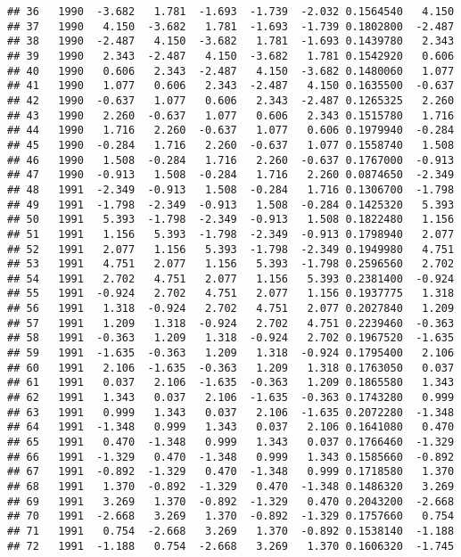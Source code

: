 \documentclass[]{article}
\begin{document}
\begin{verbatim}
## 36   1990  -3.682   1.781  -1.693  -1.739  -2.032 0.1564540   4.150
## 37   1990   4.150  -3.682   1.781  -1.693  -1.739 0.1802800  -2.487
## 38   1990  -2.487   4.150  -3.682   1.781  -1.693 0.1439780   2.343
## 39   1990   2.343  -2.487   4.150  -3.682   1.781 0.1542920   0.606
## 40   1990   0.606   2.343  -2.487   4.150  -3.682 0.1480060   1.077
## 41   1990   1.077   0.606   2.343  -2.487   4.150 0.1635500  -0.637
## 42   1990  -0.637   1.077   0.606   2.343  -2.487 0.1265325   2.260
## 43   1990   2.260  -0.637   1.077   0.606   2.343 0.1515780   1.716
## 44   1990   1.716   2.260  -0.637   1.077   0.606 0.1979940  -0.284
## 45   1990  -0.284   1.716   2.260  -0.637   1.077 0.1558740   1.508
## 46   1990   1.508  -0.284   1.716   2.260  -0.637 0.1767000  -0.913
## 47   1990  -0.913   1.508  -0.284   1.716   2.260 0.0874650  -2.349
## 48   1991  -2.349  -0.913   1.508  -0.284   1.716 0.1306700  -1.798
## 49   1991  -1.798  -2.349  -0.913   1.508  -0.284 0.1425320   5.393
## 50   1991   5.393  -1.798  -2.349  -0.913   1.508 0.1822480   1.156
## 51   1991   1.156   5.393  -1.798  -2.349  -0.913 0.1798940   2.077
## 52   1991   2.077   1.156   5.393  -1.798  -2.349 0.1949980   4.751
## 53   1991   4.751   2.077   1.156   5.393  -1.798 0.2596560   2.702
## 54   1991   2.702   4.751   2.077   1.156   5.393 0.2381400  -0.924
## 55   1991  -0.924   2.702   4.751   2.077   1.156 0.1937775   1.318
## 56   1991   1.318  -0.924   2.702   4.751   2.077 0.2027840   1.209
## 57   1991   1.209   1.318  -0.924   2.702   4.751 0.2239460  -0.363
## 58   1991  -0.363   1.209   1.318  -0.924   2.702 0.1967520  -1.635
## 59   1991  -1.635  -0.363   1.209   1.318  -0.924 0.1795400   2.106
## 60   1991   2.106  -1.635  -0.363   1.209   1.318 0.1763050   0.037
## 61   1991   0.037   2.106  -1.635  -0.363   1.209 0.1865580   1.343
## 62   1991   1.343   0.037   2.106  -1.635  -0.363 0.1743280   0.999
## 63   1991   0.999   1.343   0.037   2.106  -1.635 0.2072280  -1.348
## 64   1991  -1.348   0.999   1.343   0.037   2.106 0.1641080   0.470
## 65   1991   0.470  -1.348   0.999   1.343   0.037 0.1766460  -1.329
## 66   1991  -1.329   0.470  -1.348   0.999   1.343 0.1585660  -0.892
## 67   1991  -0.892  -1.329   0.470  -1.348   0.999 0.1718580   1.370
## 68   1991   1.370  -0.892  -1.329   0.470  -1.348 0.1486320   3.269
## 69   1991   3.269   1.370  -0.892  -1.329   0.470 0.2043200  -2.668
## 70   1991  -2.668   3.269   1.370  -0.892  -1.329 0.1757660   0.754
## 71   1991   0.754  -2.668   3.269   1.370  -0.892 0.1538140  -1.188
## 72   1991  -1.188   0.754  -2.668   3.269   1.370 0.1606320  -1.745

\end{verbatim}
\end{document}
